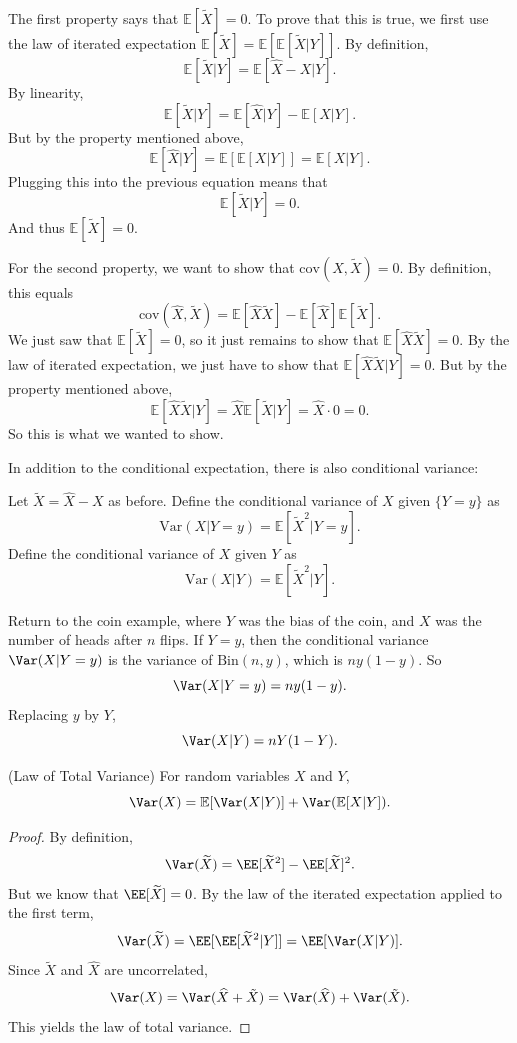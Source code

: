 \documentclass{ximera}
\begin{document}
The first property says that $\mathbb{E}[\widetilde{X}]=0$. To prove that this is true, we first use the law of iterated expectation $\mathbb{E}[\widetilde{X}] = \mathbb{E}[ \mathbb{E}[ \widetilde{X} \vert Y]]$. By definition, 
$$
\mathbb{E}[ \widetilde{X} \vert Y ] = \mathbb{E}[ \widehat{X} - X \vert Y].
$$
By linearity,
$$
\mathbb{E}[ \widetilde{X} \vert Y ] = \mathbb{E}[\widehat{X} \vert Y] - \mathbb{E}[X \vert Y].
$$
But by the property mentioned above,
$$
\mathbb{E}[\widehat{X} \vert Y] = \mathbb{E}[ \mathbb{E}[X \vert Y]] = \mathbb{E}[X \vert Y].
$$
Plugging this into the previous equation means that
$$
\mathbb{E}[ \widetilde{X} \vert Y ] =0.
$$
And thus $\mathbb{E}[\widetilde{X}]=0$.

For the second property, we want to show that $\mathrm{cov}(\widehat{X}, \widetilde{X})=0$. By definition, this equals
$$
\mathrm{cov}(\widehat{X}, \widetilde{X})= \mathbb{E}[\widehat{X} \widetilde{X}] - \mathbb{E}[\widehat{X}] \mathbb{E}[\widetilde{X}].
$$
We just saw that $\mathbb{E}[\widetilde{X}]=0$, so it just remains to show that $\mathbb{E}[\widehat{X} \widetilde{X}]=0$. By the law of iterated expectation, we just have to show that $\mathbb{E}[\widehat{X} \widetilde{X} \vert Y]=0$. But by the property mentioned above,
$$
\mathbb{E}[\widehat{X} \widetilde{X} \vert Y] = \widehat{X} \mathbb{E}[\widetilde{X} \vert Y] = \widehat{X} \cdot 0 =0.
$$
So this is what we wanted to show.

In addition to the conditional expectation, there is also conditional variance:

\begin{definition}
Let $\widetilde{X} = \hat{X} -X$ as before. Define the conditional variance of $X$ given $\{Y=y\}$ as
$$
\mathrm{Var}(X \vert Y=y) = \mathbb{E}[\widetilde{X}^2 \vert Y=y].
$$
Define the conditional variance of $X$ given $Y$ as
$$
\mathrm{Var}(X \vert Y) = \mathbb{E}[\widetilde{X}^2 \vert Y].
$$
\end{definition}

\begin{example}
Return to the coin example, where $Y$ was the bias of the coin, and $X$ was the number of heads after $n$ flips. If $Y=y$, then the conditional variance $\Var(X \vert Y=y)$ is the variance of $\textrm{Bin}(n,y)$, which is $ny(1-y)$. So
$$
\Var(X \vert Y=y) = ny(1-y).
$$
Replacing $y$ by $Y$,
$$
\Var(X \vert Y) = nY(1-Y).
$$
\end{example}

\begin{theorem} (Law of Total Variance)
For random variables $X$ and $Y$,
$$
\Var(X) = \mathbb{E}[\Var(X \vert Y)] + \Var(\mathbb{E}[ X \vert Y]).
$$
\end{theorem}
\begin{proof}
By definition,
$$
\Var(\widetilde{X}) = \EE[\widetilde{X}^2] - \EE[\widetilde{X}]^2.
$$
But we know that $\EE[\widetilde{X}]=0$. By the law of the iterated expectation applied to the first term,
$$
\Var(\widetilde{X}) = \EE[ \EE[ \widetilde{X}^2 \vert Y]] = \EE[\Var(X \vert Y)].
$$
Since $\tilde{X}$ and $\widehat{X}$ are uncorrelated, 
$$
\Var(X) = \Var(\widehat{X} + \tilde{X}) = \Var(\widehat{X} )+ \Var(\tilde{X}) .
$$
This yields the law of total variance.
\end{proof}
\end{document}
